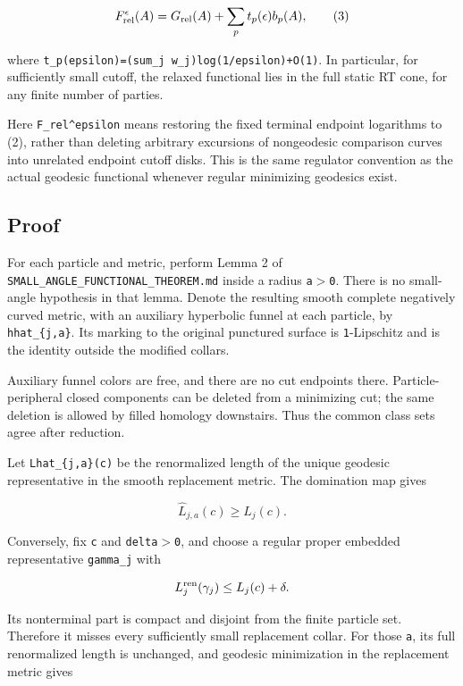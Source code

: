 \documentclass[11pt]{article}
\renewcommand{\textgreater}{\ensuremath{>}}
\begin{document}
\[
F_{\rm rel}^{\epsilon}(A)
=G_{\rm rel}(A)+\sum_p t_p(\epsilon)b_p(A),
\tag{3}
\]

where \texttt{t\_\allowbreak p(epsilon)=(sum\_\allowbreak j\ w\_\allowbreak j)log(1/epsilon)+O(1)}. In
particular, for sufficiently small cutoff, the relaxed functional lies
in the full static RT cone, for any finite number of parties.

Here \texttt{F\_\allowbreak rel\^{}epsilon} means restoring the fixed terminal
endpoint logarithms to (2), rather than deleting arbitrary excursions of
nongeodesic comparison curves into unrelated endpoint cutoff disks. This
is the same regulator convention as the actual geodesic functional
whenever regular minimizing geodesics exist.

\subsection{Proof}\label{proof}

For each particle and metric, perform Lemma 2 of
\texttt{SMALL\_\allowbreak ANGLE\_\allowbreak FUNCTIONAL\_\allowbreak THEOREM.md} inside a radius
\texttt{a\textgreater{}0}. There is no small-angle hypothesis in that
lemma. Denote the resulting smooth complete negatively curved metric,
with an auxiliary hyperbolic funnel at each particle, by
\texttt{hhat\_\allowbreak \{j,a\}}. Its marking to the original punctured surface is
\texttt{1}-Lipschitz and is the identity outside the modified collars.

Auxiliary funnel colors are free, and there are no cut endpoints there.
Particle-peripheral closed components can be deleted from a minimizing
cut; the same deletion is allowed by filled homology downstairs. Thus
the common class sets agree after reduction.

Let \texttt{Lhat\_\allowbreak \{j,a\}(c)} be the renormalized length of the unique
geodesic representative in the smooth replacement metric. The domination
map gives

\[
\widehat L_{j,a}(c)\ge L_j(c).
\tag{4}
\]

Conversely, fix \texttt{c} and \texttt{delta\textgreater{}0}, and choose
a regular proper embedded representative \texttt{gamma\_\allowbreak j} with

\[
L_j^{\rm ren}(\gamma_j)\le L_j(c)+\delta.
\]

Its nonterminal part is compact and disjoint from the finite particle
set. Therefore it misses every sufficiently small replacement collar.
For those \texttt{a}, its full renormalized length is unchanged, and
geodesic minimization in the replacement metric gives
\end{document}
